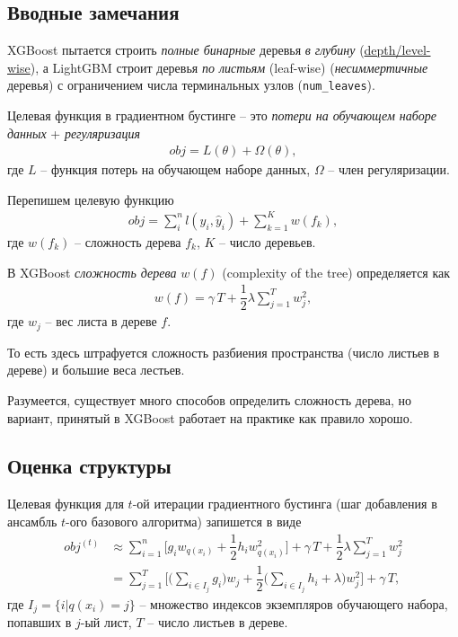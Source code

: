 \documentclass[%
	11pt,
	a4paper,
	utf8,
		]{article}
\begin{document}
\subsection{Вводные замечания}

XGBoost пытается строить \emph{полные бинарные} деревья \emph{в глубину} (\href{https://lightgbm.readthedocs.io/en/latest/Experiments.html}{depth/level-wise}), а LightGBM строит деревья \emph{по листьям} (leaf-wise) (\emph{несиммертичные} деревья) с ограничением числа терминальных узлов (\verb|num_leaves|).

Целевая функция в градиентном бустинге -- это \emph{потери на обучающем наборе данных} + \emph{регуляризация}
\begin{align*}
	obj  = L(\theta) + \Omega (\theta),
\end{align*}
где $ L $ -- функция потерь на обучающем наборе данных, $ \Omega $ -- член регуляризации.

Перепишем целевую функцию
\begin{align*}
	obj = \sum_i^n l(y_i, \hat{y}_i) +\sum_{k=1}^K w(f_k),
\end{align*}
где $ w(f_k) $ -- сложность дерева $ f_k $, $ K $ -- число деревьев.

В XGBoost \emph{сложность дерева} $ w(f) $ (complexity of the tree) определяется как
\begin{align*}
	w(f) = \gamma \, T + \dfrac{1}{2} \lambda \sum_{j=1}^{T} w_j^2,
\end{align*}
где $ w_j $ -- вес листа в дереве $ f $.

То есть здесь штрафуется сложность разбиения пространства (число листьев в дереве) и большие веса лестьев.

Разумеется, существует много способов определить сложность дерева, но вариант, принятый в XGBoost работает на практике как правило хорошо.

\subsection{Оценка структуры}

Целевая функция для $ t $-ой итерации градиентного бустинга (шаг добавления в ансамбль $ t $-ого базового алгоритма) запишется в виде
\begin{align*}
	obj^{(t)} &\approx \sum_{i=1}^n \Big[ g_i w_{ q(x_i) } + \dfrac{1}{2}h_i w_{ q(x_i) }^2 \Big] + \gamma \, T + \dfrac{1}{2} \lambda \sum_{j=1}^T w_j^2 \\
	 &= \sum_{j=1}^T \Big[ \Big( \sum_{ i \in I_j } g_i \Big) w_j + \dfrac{1}{2} \Big( \sum_{i \in I_j} h_i +\lambda \Big) w_j^2 \Big] + \gamma \, T,
\end{align*}
где $ I_j = \{ i | q(x_i) = j \} $ -- множество индексов экземпляров обучающего набора, попавших в $ j $-ый лист, $ T $ -- число листьев в дереве.
\end{document}
